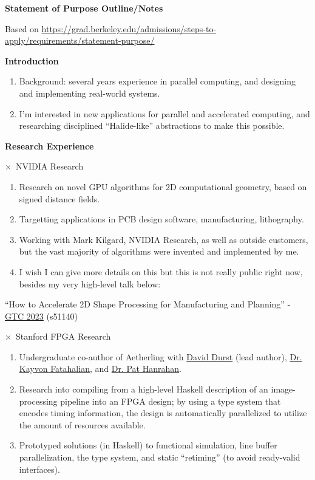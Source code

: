 \documentclass[11pt]{article}
\newcommand{\web}[1]{{\color{webColor} \small \url{#1}}}
\newcommand{\webText}[2]{{\color{webColor} \href{#1}{#2}}}
\newcommand{\myTitle}[1]{{ \vspace{2mm} \large \color{titleColor} \hspace{-12mm} \textbf{\textsf{#1}} \vspace{2mm}}}
\newcommand{\mySub}[1]{{\color{subColor}\hspace{-6mm} \( \times \)\ \textsf{#1}}}
\begin{document}
\raggedright
\reversemarginpar
\begin{center}
\textsf{\textbf{Statement of Purpose Outline/Notes}}
\end{center}

Based on \web{https://grad.berkeley.edu/admissions/steps-to-apply/requirements/statement-purpose/}

\myTitle{Introduction}

\begin{enumerate}
\item Background: several years experience in parallel computing, and
  designing and implementing real-world systems.
\item I'm interested in new applications for parallel and accelerated
  computing, and researching disciplined ``Halide-like'' abstractions
  to make this possible.
\end{enumerate}

\myTitle{Research Experience}

\mySub{NVIDIA Research}

\begin{enumerate}
\item Research on novel GPU algorithms for 2D computational geometry,
  based on signed distance fields.
\item Targetting applications in PCB design software, manufacturing, lithography.
\item Working with Mark Kilgard, NVIDIA Research, as well as outside
  customers, but the vast majority of algorithms were invented and
  implemented by me.
\item I wish I can give more details on this but this is not really
  public right now, besides my very high-level talk below:
\end{enumerate}

``How to Accelerate 2D Shape Processing for Manufacturing and Planning''
- \webText{https://www.nvidia.com/en-us/on-demand/session/gtcspring23-s51140/}{GTC 2023}
(s51140)
\filbreak

\mySub{Stanford FPGA Research}

\begin{enumerate}
\item Undergraduate co-author of Aetherling with
  \webText{https://david-durst.github.io/}{David Durst} (lead author),
  \webText{https://graphics.stanford.edu/~kayvonf/}{Dr. Kayvon Fatahalian},
  and \webText{https://graphics.stanford.edu/~hanrahan/}{Dr. Pat Hanrahan}.
\item Research into compiling from a high-level Haskell description of
  an image-processing pipeline into an FPGA design; by using a type
  system that encodes timing information, the design is automatically
  parallelized to utilize the amount of resources available.
\item Prototyped solutions (in Haskell) to functional simulation, line
  buffer parallelization, the type system, and static ``retiming'' (to
  avoid ready-valid interfaces).
\end{enumerate}
\end{document}
